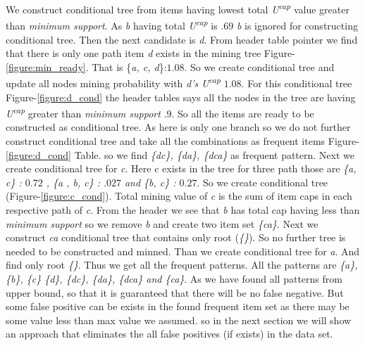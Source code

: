 	We construct conditional tree from items having lowest total \emph{U\textsuperscript{cap}} value greater than \emph{minimum support}. As \emph{b} having total \emph{U\textsuperscript{cap}} is $.69$ \emph{b} is ignored for constructing conditional tree. Then the next candidate is \emph{d}. From header table pointer we find that there is only one path item \emph{d} exists in the mining tree Figure-\ref{figure:min_ready}. That is \{\emph{a, c, d}\}:$1.08$. So we create conditional tree and update all nodes mining probability with \emph{d's} \emph{U\textsuperscript{cap}} $1.08$. For this conditional tree Figure-\ref{figure:d_cond} the header tables says all the nodes in the tree are having \emph{U\textsuperscript{cap}} greater than \emph{minimum support} $.9$. So all the items are ready to be constructed as conditional tree. As here is only one branch so we do not further construct conditional tree and take all the combinations as frequent items Figure-\ref{figure:d_cond} Table. so we find \emph{\{dc\}, \{da\}, \{dca\}} as frequent pattern. Next we create conditional tree for \emph{c}. Here c exists in the tree for three path those are \emph{\{a, c\} : $0.72$ , \{a , b, c\} : $.027$ and \{b, c\} : $0.27$}. So we create conditional tree (Figure-\ref{figure:c_cond}). Total mining value of \emph{c} is the sum of item caps in each respective path of \emph{c}. From the header we see that  \emph{b} has total cap having less than \emph{minimum support} so we remove \emph{b} and create two item set \emph{\{ca\}}. Next we construct \emph{ca} conditional tree that contains only root (\emph{\{\}}). So no further tree is needed to be constructed and minned. Than we create conditional tree for \emph{a}. And find only root \emph{\{\}}. Thus we get all the  frequent patterns. All the patterns are \emph{\{a\}, \{b\}, \{c\} \{d\}, \{dc\}, \{da\}, \{dca\} and \{ca\}}. As we have found all patterns from upper bound, so that it is guaranteed that there will be no false negative. But some false positive can be exists in the found frequent item set as there may be some value less than max value we assumed. so in the next section we will show an approach that eliminates the all false positives (if exists) in the data set.
	
	

